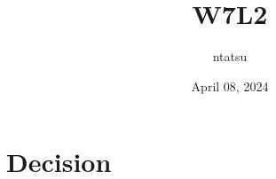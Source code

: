 \documentclass{article}
\title{W7L2}
\author{ntatsu}
\date{April 08, 2024}
\theoremstyle{definition}
\theoremstyle{remark}
\begin{document}
\maketitle

\section{Decision}

\end{document}
